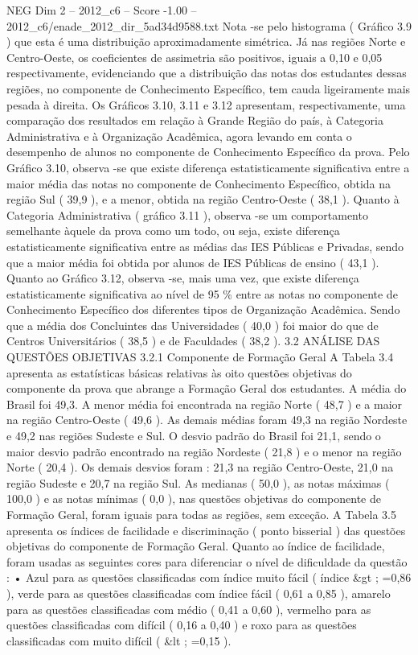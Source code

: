 \begin{textsample}{NEG Dim 2 – 2012\_c6 – Score -1.00 – 2012\_c6/enade\_2012\_dir\_5ad34d9588.txt}
Nota -se pelo histograma ( Gráfico 3.9 ) que esta é uma distribuição aproximadamente simétrica.
Já nas regiões Norte e Centro-Oeste, os coeficientes de assimetria são positivos, iguais a 0,10 e 0,05 respectivamente, evidenciando que a distribuição das notas dos estudantes dessas regiões, no componente de Conhecimento Específico, tem cauda ligeiramente mais pesada à direita.
Os Gráficos 3.10, 3.11 e 3.12 apresentam, respectivamente, uma comparação dos resultados em relação à Grande Região do país, à Categoria Administrativa e à Organização Acadêmica, agora levando em conta o desempenho de alunos no componente de Conhecimento Específico da prova.
Pelo Gráfico 3.10, observa -se que existe diferença estatisticamente significativa entre a maior média das notas no componente de Conhecimento Específico, obtida na região Sul ( 39,9 ), e a menor, obtida na região Centro-Oeste ( 38,1 ).
Quanto à Categoria Administrativa ( gráfico 3.11 ), observa -se um comportamento semelhante àquele da prova como um todo, ou seja, existe diferença estatisticamente significativa entre as médias das IES Públicas e Privadas, sendo que a maior média foi obtida por alunos de IES Públicas de ensino ( 43,1 ).
Quanto ao Gráfico 3.12, observa -se, mais uma vez, que existe diferença estatisticamente significativa ao nível de 95 \% entre as notas no componente de Conhecimento Específico dos diferentes tipos de Organização Acadêmica.
Sendo que a média dos Concluintes das Universidades ( 40,0 ) foi maior do que de Centros Universitários ( 38,5 ) e de Faculdades ( 38,2 ). 3.2 ANÁLISE DAS QUESTÕES OBJETIVAS 3.2.1 Componente de Formação Geral A Tabela 3.4 apresenta as estatísticas básicas relativas às oito questões objetivas do componente da prova que abrange a Formação Geral dos estudantes.
A média do Brasil foi 49,3.
A menor média foi encontrada na região Norte ( 48,7 ) e a maior na região Centro-Oeste ( 49,6 ).
As demais médias foram 49,3 na região Nordeste e 49,2 nas regiões Sudeste e Sul.
O desvio padrão do Brasil foi 21,1, sendo o maior desvio padrão encontrado na região Nordeste ( 21,8 ) e o menor na região Norte ( 20,4 ).
Os demais desvios foram : 21,3 na região Centro-Oeste, 21,0 na região Sudeste e 20,7 na região Sul.
As medianas ( 50,0 ), as notas máximas ( 100,0 ) e as notas mínimas ( 0,0 ), nas questões objetivas do componente de Formação Geral, foram iguais para todas as regiões, sem exceção.
A Tabela 3.5 apresenta os índices de facilidade e discriminação ( ponto bisserial ) das questões objetivas do componente de Formação Geral.
Quanto ao índice de facilidade, foram usadas as seguintes cores para diferenciar o nível de dificuldade da questão : • Azul para as questões classificadas com índice muito fácil ( índice \&gt ; =0,86 ), verde para as questões classificadas com índice fácil ( 0,61 a 0,85 ), amarelo para as questões classificadas com médio ( 0,41 a 0,60 ), vermelho para as questões classificadas com difícil ( 0,16 a 0,40 ) e roxo para as questões classificadas com muito difícil ( \&lt ; =0,15 ).

\end{textsample}
